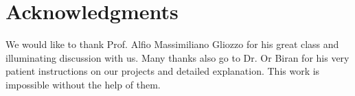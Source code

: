 \documentclass{acm_proc_article-sp}
\begin{document}
\section{Acknowledgments}
We would like to thank Prof. Alfio Massimiliano Gliozzo for his great class and illuminating discussion with us. Many thanks also go to Dr. Or Biran for his very patient instructions on our projects and detailed explanation. This work is impossible without the help of them. 



\balancecolumns
\end{document}
